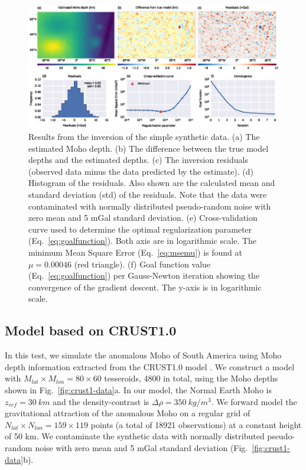\documentclass[extra]{gji}
\begin{document}
\begin{figure}
    \centering
    \includegraphics[width=\textwidth]{figures/synthetic-simple-results}
    \caption{
        Results from the inversion of the simple synthetic data.
        (a) The estimated Moho depth.
        (b) The difference between the true model depths
        and the estimated depths.
        (c) The inversion residuals (observed data minus
        the data predicted by the estimate).
        (d) Histogram of the residuals. Also shown are the calculated
        mean and standard deviation (std) of the residuals.
        Note that the data were contaminated with normally distributed
        pseudo-random noise with zero mean and 5 mGal standard deviation.
        (e) Cross-validation curve used to determine the optimal regularization
        parameter (Eq.~\ref{eq:goalfunction}).
        Both axis are in logarithmic scale.
        The minimum Mean Square Error (Eq.~\ref{eq:msemu}) is found at
        $\mu = 0.00046$ (red triangle).
        (f) Goal function value (Eq.~\ref{eq:goalfunction}) per Gauss-Newton
        iteration showing the convergence of the gradient descent.
        The y-axis is in logarithmic scale.
    }
    \label{fig:simple-results}
\end{figure}




\subsection{Model based on CRUST1.0}

In this test, we simulate the anomalous Moho of South America
using Moho depth information extracted from the CRUST1.0 model
\citep{laske2013}.
We construct a model with
$M_{lat} \times M_{lon} = 80 \times 60$ tesseroids, 4800 in total,
using the Moho depths shown in Fig.~\ref{fig:crust1-data}a.
In our model, the Normal Earth Moho is $z_{ref} = 30\ km$ and
the density-contrast is $\Delta\rho = 350\ kg/m^3$.
We forward model the gravitational attraction of the anomalous Moho
on a regular grid of $N_{lat} \times N_{lon} = 159 \times 119$ points
(a total of 18921 observations) at a constant height of 50 km.
We contaminate the synthetic data with normally distributed pseudo-random noise
with zero mean and 5 mGal standard deviation (Fig.~\ref{fig:crust1-data}b).
\end{document}
